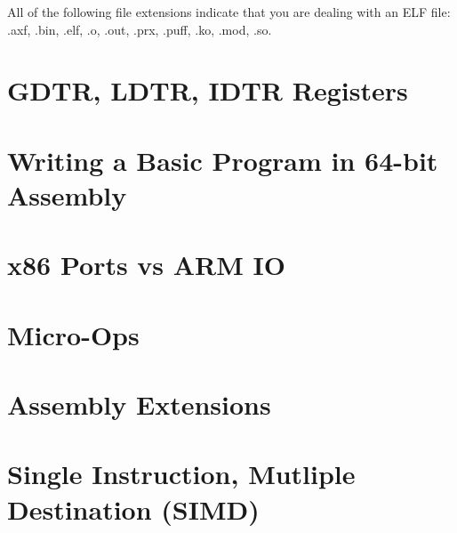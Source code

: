 \documentclass{article}
\begin{document}
	All of the following file extensions indicate that you are dealing with an ELF file: .axf, .bin, .elf, .o, .out, 
   .prx, .puff, .ko, .mod, .so.

\section{GDTR, LDTR, IDTR Registers}

\section{Writing a Basic Program in 64-bit Assembly}

\section{x86 Ports vs ARM I\/O}

\section{Micro-Ops}

\section{Assembly Extensions}

\section{Single Instruction, Mutliple Destination (SIMD)}
\end{document}
